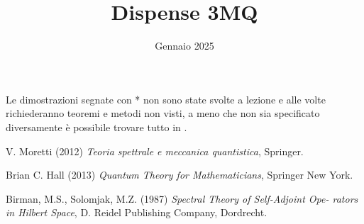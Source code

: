 \documentclass[12pt,a4paper]{report}
\theoremstyle{definition}
\numberwithin{equation}{section}
\theoremstyle{plain}
\theoremstyle{remark}
\DeclareMathOperator\Sw{ S(\mathbb{R}^n) }
\DeclareMathOperator\Cc{ C^\infty_c(\mathbb{R}^n) }
\DeclareMathOperator\B{ \mathfrak{B}(\mathcal{H}) }
\begin{document}
\title{Dispense 3MQ}
\date{Gennaio 2025}
\maketitle
\vspace{8.0cm}

Le dimostrazioni segnate con * non sono state svolte a lezione e alle volte richiederanno teoremi e metodi non visti, a meno che non sia specificato diversamente è possibile trovare tutto in \cite{Mor}.
$\B \; \Cc \Sw$
\vspace{1.0cm}


\newpage
\tableofcontents 
\newpage










\begin{thebibliography}{20}

V. Moretti (2012) \emph{Teoria spettrale e meccanica quantistica}, Springer.

Brian C. Hall (2013) \emph{Quantum Theory for Mathematicians}, Springer New York. 

Birman, M.S., Solomjak, M.Z. (1987) \emph{Spectral Theory of Self-Adjoint Ope-
rators in Hilbert Space}, D. Reidel Publishing Company, Dordrecht.

\end{thebibliography}
\end{document}
